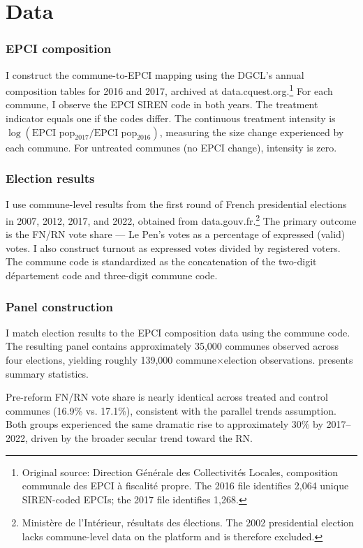 \documentclass[12pt]{article}
\begin{document}
\section{Data}

\subsubsection*{EPCI composition} I construct the commune-to-EPCI mapping using the DGCL's annual composition tables for 2016 and 2017, archived at data.cquest.org.\footnote{Original source: Direction G\'{e}n\'{e}rale des Collectivit\'{e}s Locales, composition communale des EPCI \`{a} fiscalit\'{e} propre. The 2016 file identifies 2,064 unique SIREN-coded EPCIs; the 2017 file identifies 1,268.} For each commune, I observe the EPCI SIREN code in both years. The treatment indicator equals one if the codes differ. The continuous treatment intensity is $\log(\text{EPCI pop}_{2017} / \text{EPCI pop}_{2016})$, measuring the size change experienced by each commune. For untreated communes (no EPCI change), intensity is zero.

\subsubsection*{Election results} I use commune-level results from the first round of French presidential elections in 2007, 2012, 2017, and 2022, obtained from data.gouv.fr.\footnote{Minist\`{e}re de l'Int\'{e}rieur, r\'{e}sultats des \'{e}lections. The 2002 presidential election lacks commune-level data on the platform and is therefore excluded.} The primary outcome is the FN/RN vote share --- Le Pen's votes as a percentage of expressed (valid) votes. I also construct turnout as expressed votes divided by registered voters. The commune code is standardized as the concatenation of the two-digit d\'{e}partement code and three-digit commune code.

\subsubsection*{Panel construction} I match election results to the EPCI composition data using the commune code. The resulting panel contains approximately 35,000 communes observed across four elections, yielding roughly 139,000 commune$\times$election observations.  presents summary statistics.



Pre-reform FN/RN vote share is nearly identical across treated and control communes (16.9\% vs. 17.1\%), consistent with the parallel trends assumption. Both groups experienced the same dramatic rise to approximately 30\% by 2017--2022, driven by the broader secular trend toward the RN.
\end{document}

